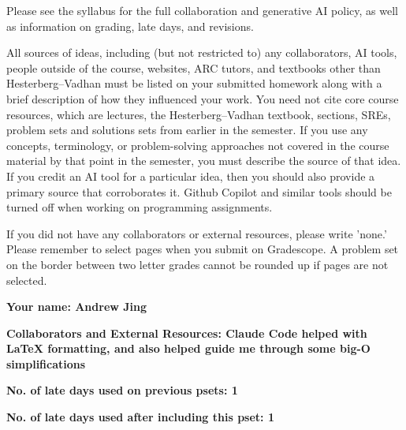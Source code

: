 \documentclass[11pt]{article}
\begin{document}

Please see the syllabus for the full collaboration and generative AI policy, as well as information on grading, late days, and revisions.

All sources of ideas, including (but not restricted to) any collaborators, AI tools, people outside of the course, websites, ARC tutors, and textbooks other than Hesterberg--Vadhan must be listed on your submitted homework along with a brief description of how they influenced your work. You need not cite core course resources, which are lectures, the Hesterberg--Vadhan textbook, sections, SREs, problem sets and solutions sets from earlier in the semester. If you use any concepts, terminology, or problem-solving approaches not covered in the course material by that point in the semester, you must describe the source of that idea. If you credit an AI tool for a particular idea, then you should also provide a primary source that corroborates it. Github Copilot and similar tools should be turned off when working on programming assignments.

If you did not have any collaborators or external resources, please write 'none.' Please remember to select pages when you submit on Gradescope. A problem set on the border between two letter grades cannot be rounded up if pages are not selected.

\vspace{1em}

\textbf{Your name: Andrew Jing}

\textbf{Collaborators and External Resources: Claude Code helped with LaTeX formatting, and also helped guide me through some big-O simplifications}

\textbf{No. of late days used on previous psets: 1}

\textbf{No. of late days used after including this pset: 1}
\end{document}
